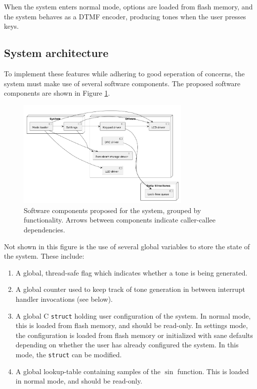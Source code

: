 \documentclass[11pt,a4paper
]{scrartcl}
\begin{document}
When the system enters normal mode, options are loaded from flash memory, and the system behaves as a DTMF encoder, 
producing tones when the user presses keys.

\subsection{System architecture}

To implement these features while adhering to good seperation of concerns, the system must make use of several software components.
The proposed software components are shown in Figure \ref{fig:software_components}.

\begin{figure}
   \centering
   \includegraphics[width=0.75\textwidth]{software_components}
   \caption{Software components proposed for the system, grouped by functionality. Arrows between components indicate caller-callee dependencies.}
   \label{fig:software_components}
\end{figure}

Not shown in this figure is the use of several global variables to store the state of the system. These include:

\begin{enumerate}
   \item A global, thread-safe flag which indicates whether a tone is being generated.
   \item A global counter used to keep track of tone generation in between interrupt handler invocations (see below).
   \item A global C \verb!struct! holding user configuration of the system. 
      In normal mode, this is loaded from flash memory, and should be read-only.
      In settings mode, the configuration is loaded from flash memory or initialized with sane defaults depending on whether the user has already 
      configured the system. In this mode, the \verb!struct! can be modified.
   \item A global lookup-table containing samples of the $\sin$ function. This is loaded in normal mode, and should be read-only.
\end{enumerate}
\end{document}
